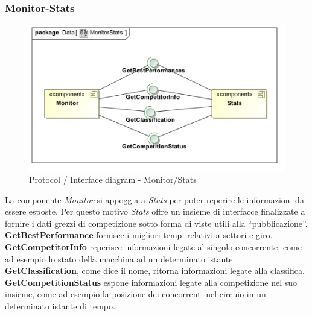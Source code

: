 \subsubsection{Monitor-Stats}
\begin{center}
\begin{figure}[h!]
	\includegraphics[scale=0.55]{img/InteractionDiagram/Implementation_Diagram__MonitorStats.jpg}
\caption{Protocol / Interface diagram - Monitor/Stats}
\end{figure}
\end{center}
La componente \emph{Monitor} si appoggia a \emph{Stats} per poter reperire le informazioni da essere esposte. Per questo motivo
\emph{Stats} offre un insieme di interfacce finalizzate a fornire i dati grezzi di competizione sotto forma di viste utili alla ``pubblicazione''.\\
\textbf{GetBestPerformance} fornisce i migliori tempi relativi a settori e giro.\\
\textbf{GetCompetitorInfo} reperisce informazioni legate al singolo concorrente, come ad esempio lo stato della macchina ad un determinato istante.\\
\textbf{GetClassification}, come dice il nome, ritorna informazioni legate alla classifica.\\
\textbf{GetCompetitionStatus} espone informazioni legate alla competizione nel suo insieme, come ad esempio la posizione dei concorrenti nel circuio
in un determinato istante di tempo.
\clearpage
